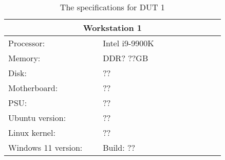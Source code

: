 \begin{table}[H]
    \centering
    \begin{tabular}{|| p{0.38\linewidth} | p{0.49\linewidth} ||}
    \hline
    \multicolumn{2}{||c||}{Workstation 1}           \\ [0.5ex] \hline\hline
    Processor:          & Intel i9-9900K \\
    Memory:             & DDR? ??GB                     \\
    Disk:               & ?? \\
    Motherboard:        & ??      \\
    PSU:                & ?? \\
    Ubuntu version:     & ??        \\
    Linux kernel:       & ??       \\
    Windows 11 version: & Build: ?? \\ \hline
    \end{tabular}
    \caption{The specifications for DUT 1}
    \label{tab:DUT1}
\end{table}